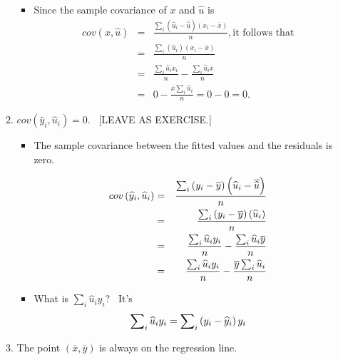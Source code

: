 \documentclass[11pt]{article}
\begin{document}
\begin{itemize}
\begin{enumerate}
\begin{itemize}
\item Since the sample covariance of $x$ and $\widehat{u}$ is%
\begin{eqnarray*}
cov(x,\widehat{u}) &=&\frac{\sum\nolimits_{i}\left( \widehat{u}_{i}-%
\overline{\widehat{u}}\right) \left( x_{i}-\overline{x}\right) }{n},\text{
it follows that} \\
&=&\frac{\sum\nolimits_{i}\left( \widehat{u}_{i}\right) \left( x_{i}-%
\overline{x}\right) }{n} \\
&=&\frac{\sum\nolimits_{i}\widehat{u}_{i}x_{i}}{n}-\frac{\sum\nolimits_{i}%
\widehat{u}_{i}\overline{x}}{n} \\
&=&0-\frac{\overline{x}\sum\nolimits_{i}\widehat{u}_{i}}{n}=0-0=0.
\end{eqnarray*}
\end{itemize}

\item $cov\left( \widehat{y}_{i},\widehat{u}_{i}\right) =0.$ \ [LEAVE AS
EXERCISE.]

\begin{itemize}
\item The sample covariance between the fitted values and the residuals is
zero.

\begin{eqnarray*}
cov\left( \widehat{y}_{i},\widehat{u}_{i}\right) &=&\frac{%
\sum\nolimits_{i}\left( y_{i}-\overline{y}\right) \left( \widehat{u}_{i}-%
\overline{\widehat{u}}\right) }{n} \\
&=&\frac{\sum\nolimits_{i}\left( y_{i}-\overline{y}\right) \left( \widehat{u}%
_{i}\right) }{n} \\
&=&\frac{\sum\nolimits_{i}\widehat{u}_{i}y_{i}}{n}-\frac{\sum\nolimits_{i}%
\widehat{u}_{i}\overline{y}}{n} \\
&=&\frac{\sum\nolimits_{i}\widehat{u}_{i}y_{i}}{n}-\frac{\overline{y}%
\sum\nolimits_{i}\widehat{u}_{i}}{n}
\end{eqnarray*}

\item What is $\sum\nolimits_{i}\widehat{u}_{i}y_{i}$? \ It's%
\begin{equation*}
\sum\nolimits_{i}\widehat{u}_{i}y_{i}=\sum\nolimits_{i}\left( y_{i}-\widehat{%
y}_{i}\right) y_{i}
\end{equation*}
\end{itemize}

\item The point $(\overline{x},\overline{y})$ is always on the regression
line.


\end{enumerate}
\end{itemize}
\end{document}
